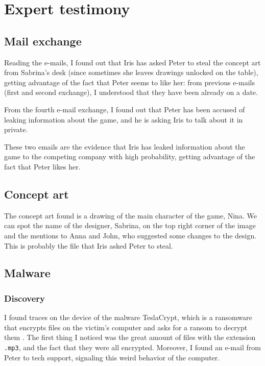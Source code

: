 \documentclass[12pt]{article}
\begin{document}
\section{Expert testimony}

\subsection{Mail exchange}
\label{sec:mail}

Reading the e-mails, I found out that Iris has asked Peter to steal the concept art from Sabrina's desk (since sometimes she leaves drawings unlocked on the table), getting advantage of the fact that Peter seems to like her: from previous e-mails (first and second exchange), I understood that they have been already on a date.

From the fourth e-mail exchange, I found out that Peter has been accused of leaking information about the game, and he is asking Iris to talk about it in private.

These two emails are the evidence that Iris has leaked information about the game to the competing company with high probability, getting advantage of the fact that Peter likes her.

\subsection{Concept art}
\label{sec:art}

The concept art found is a drawing of the main character of the game, Nina. We can spot the name of the designer, Sabrina, on the top right corner of the image and the mentions to Anna and John, who suggested some changes to the design. This is probably the file that Iris asked Peter to steal.

\subsection{Malware}
\label{sec:malware}

\subsubsection{Discovery}
I found traces on the device of the malware TeslaCrypt, which is a ransomware that encrypts files on the victim's computer and asks for a ransom to decrypt them \cite{teslacrypt}.
The first thing I noticed was the great amount of files with the extension \texttt{.mp3}, and the fact that they were all encrypted.
Moreover, I found an e-mail from Peter to tech support, signaling this weird behavior of the computer.
\end{document}
